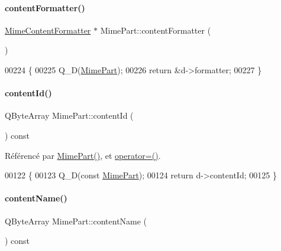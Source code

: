 \paragraph{\texorpdfstring{content\+Formatter()}{contentFormatter()}}
{\footnotesize\ttfamily \hyperlink{class_simple_mail_1_1_mime_content_formatter}{Mime\+Content\+Formatter} $\ast$ Mime\+Part\+::content\+Formatter (\begin{DoxyParamCaption}{ }\end{DoxyParamCaption})}


\begin{DoxyCode}
00224 \{
00225     Q\_D(\hyperlink{class_simple_mail_1_1_mime_part}{MimePart});
00226     \textcolor{keywordflow}{return} &d->formatter;
00227 \}
\end{DoxyCode}
\mbox{\label{class_simple_mail_1_1_mime_part_a95fbca14bef123a2b65227f4d26622a5}} 
\paragraph{\texorpdfstring{content\+Id()}{contentId()}}
{\footnotesize\ttfamily Q\+Byte\+Array Mime\+Part\+::content\+Id (\begin{DoxyParamCaption}{ }\end{DoxyParamCaption}) const}



Référencé par \hyperlink{class_simple_mail_1_1_mime_part_a22b25ea7c1bb06d1b73f4c43103bfa1e}{Mime\+Part()}, et \hyperlink{class_simple_mail_1_1_mime_part_a34320574f8cba9dbe03cca99e3fca942}{operator=()}.


\begin{DoxyCode}
00122 \{
00123     Q\_D(\textcolor{keyword}{const} \hyperlink{class_simple_mail_1_1_mime_part}{MimePart});
00124     \textcolor{keywordflow}{return} d->contentId;
00125 \}
\end{DoxyCode}
\mbox{\label{class_simple_mail_1_1_mime_part_ad16adf3afc9873b4b0636cd3264e2f3e}} 
\paragraph{\texorpdfstring{content\+Name()}{contentName()}}
{\footnotesize\ttfamily Q\+Byte\+Array Mime\+Part\+::content\+Name (\begin{DoxyParamCaption}{ }\end{DoxyParamCaption}) const}



